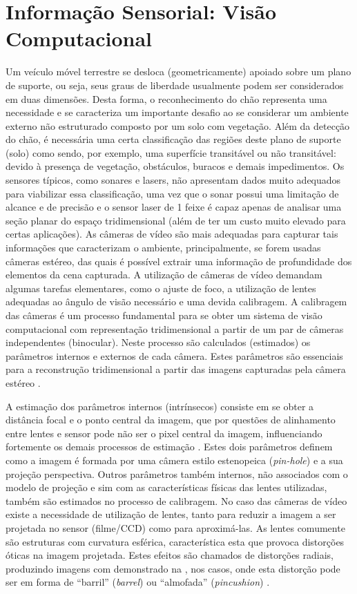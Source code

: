 \section{Informação Sensorial: Visão Computacional}

Um veículo móvel terrestre se desloca (geometricamente) apoiado sobre um plano
de suporte, ou seja, seus graus de liberdade usualmente podem ser considerados
em duas dimensões. Desta forma, o reconhecimento do chão representa uma
necessidade e se caracteriza um importante desafio ao se considerar um ambiente
externo não estruturado composto por um solo com vegetação. Além da detecção do
chão, é necessária uma certa classificação das regiões deste plano de suporte
(solo) como sendo, por exemplo, uma superfície transitável ou não transitável:
devido à presença de vegetação, obstáculos, buracos e demais impedimentos.
Os sensores típicos, como sonares e lasers, não apresentam dados muito adequados
para viabilizar essa classificação, uma vez que o sonar possui uma limitação de
alcance e de precisão e o sensor laser de 1 feixe é capaz apenas de analisar uma
seção planar do espaço tridimensional (além de ter um custo muito elevado para
certas aplicações). As câmeras de vídeo são mais adequadas para capturar tais
informações que caracterizam o ambiente, principalmente, se forem usadas câmeras
estéreo, das quais é possível extrair uma informação de profundidade dos
elementos da cena capturada. A utilização de câmeras de vídeo demandam algumas
tarefas elementares, como o ajuste de foco, a utilização de lentes adequadas ao
ângulo de visão necessário e uma devida calibragem. A calibragem das câmeras é
um processo fundamental para se obter um sistema de visão computacional com
representação tridimensional a partir de um par de câmeras independentes
(binocular). Neste processo são calculados (estimados) os parâmetros internos e
externos de cada câmera. Estes parâmetros são essenciais para a reconstrução
tridimensional a partir das imagens capturadas pela câmera estéreo
\cite{Faugeras1993}.

A estimação dos parâmetros internos (intrínsecos) consiste em se obter a
distância focal e o ponto central da imagem, que por questões de alinhamento
entre lentes e sensor pode não ser o pixel central da imagem, influenciando
fortemente os demais processos de estimação \cite{WilsonShafer1994}. Estes
dois parâmetros definem como a imagem é formada por uma câmera estilo
estenopeica (\textit{pin-hole}) e a sua projeção perspectiva. Outros parâmetros
também internos, não associados com o modelo de projeção e sim com as
características físicas das lentes utilizadas, também são estimados no processo
de calibragem. No caso das câmeras de vídeo existe a necessidade de utilização
de lentes, tanto para reduzir a imagem a ser projetada no sensor (filme/CCD)
como para aproximá-las. As lentes comumente são estruturas com curvatura
esférica, característica esta que provoca distorções óticas na imagem projetada.
Estes efeitos são chamados de distorções radiais, produzindo imagens com
demonstrado na , nos casos, onde esta distorção pode ser em
forma de “barril” (\textit{barrel}) ou “almofada” (\textit{pincushion})
\cite{Weng1992}.

